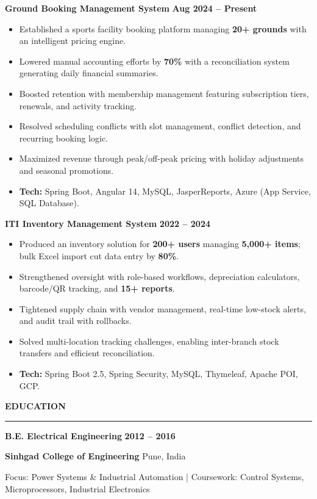 \documentclass[8pt,a4paper,withhyper]{altacv}
\renewcommand{\cvsectionfont}{\large\rmfamily\bfseries}
\renewcommand{\cvevent}[4]{%
  {\large\color{emphasis}\textbf{#1}} \ifstrequal{#3}{}{}{\hfill {\normalsize\textbf{\color{accent}#3}}} \par
  \vspace{2pt}
  \ifstrequal{#2}{}{}{%
    {\normalsize\textbf{\color{body}#2}} \ifstrequal{#4}{}{}{\hfill {\normalsize\color{body}#4}} \par
  }%
  \vspace{4pt}\normalsize
}
\renewcommand{\cvsection}[2][]{%
  \nointerlineskip\bigskip%
  {\color{heading}\cvsectionfont\MakeUppercase{#2}}\\[-1ex]%
  {\color{headingrule}\rule{\linewidth}{1.2pt}\par}\medskip
}
\begin{document}
\cvevent{Ground Booking Management System}{}{Aug 2024 -- Present}{}
\begin{itemize}
\item Established a sports facility booking platform managing \textbf{20+ grounds} with an intelligent pricing engine.
\item Lowered manual accounting efforts by \textbf{70\%} with a reconciliation system generating daily financial summaries.
\item Boosted retention with membership management featuring subscription tiers, renewals, and activity tracking.
\item Resolved scheduling conflicts with slot management, conflict detection, and recurring booking logic.
\item Maximized revenue through peak/off-peak pricing with holiday adjustments and seasonal promotions.
\item \textbf{Tech:} Spring Boot, Angular 14, MySQL, JasperReports, Azure (App Service, SQL Database).
\end{itemize}

\vspace{4pt}{\color{body!30}\hrule}\vspace{4pt}

\cvevent{ITI Inventory Management System}{}{2022 -- 2024}{}
\begin{itemize}
\item Produced an inventory solution for \textbf{200+ users} managing \textbf{5,000+ items}; bulk Excel import cut data entry by \textbf{80\%}.
\item Strengthened oversight with role-based workflows, depreciation calculators, barcode/QR tracking, and \textbf{15+ reports}.
\item Tightened supply chain with vendor management, real-time low-stock alerts, and audit trail with rollbacks.
\item Solved multi-location tracking challenges, enabling inter-branch stock transfers and efficient reconciliation.
\item \textbf{Tech:} Spring Boot 2.5, Spring Security, MySQL, Thymeleaf, Apache POI, GCP.
\end{itemize}

\cvsection{Education}
\vspace{-2pt}

\cvevent{B.E. Electrical Engineering}{Sinhgad College of Engineering}{2012 -- 2016}{Pune, India}
Focus: Power Systems \& Industrial Automation | Coursework: Control Systems, Microprocessors, Industrial Electronics
\end{document}
